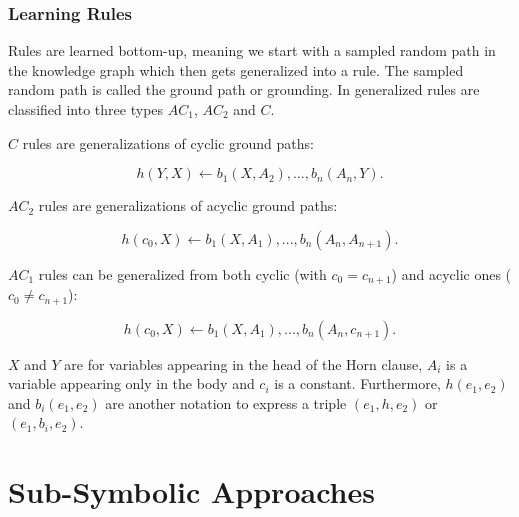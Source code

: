 \subsubsection{Learning Rules}
Rules are learned bottom-up, meaning we start with a sampled random path in the knowledge graph which then gets generalized into a rule. The sampled random path is called the ground path or grounding. In \cite{meilicke_anytime_2019} generalized rules are classified into three types $AC_1$, $AC_2$ and $C$. 

$C$ rules are generalizations of cyclic 
ground paths:

\begin{equation}
h(Y,X) \leftarrow b_1(X, A_2), ..., b_n(A_n,Y).
\end{equation}

$AC_2$ rules are generalizations of acyclic ground paths:

\begin{equation}
h(c_0,X) \leftarrow b_1(X, A_1), ..., b_n(A_n,A_{n+1}).
\end{equation}
	
$AC_1$ rules can be generalized from both cyclic (with $c_0=c_{n+1}$) and acyclic ones ($c_0\neq c_{n+1}$):

\begin{equation}
h(c_0,X) \leftarrow b_1(X, A_1), ..., b_n(A_n,c_{n+1}).
\end{equation}

$X$ and $Y$ are for variables appearing in the head of the Horn clause, $A_i$ is a variable appearing only in the body and $c_i$ is a constant. Furthermore, $h(e_1,e_2)$ and $b_i(e_1,e_2)$ are another notation to express a triple $(e_1, h, e_2)$ or $(e_1, b_i, e_2)$.

\section{Sub-Symbolic Approaches}
\label{cha:sub_symbolic_methods}

